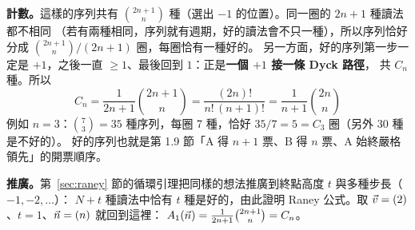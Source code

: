 \textbf{計數。}這樣的序列共有 $\binom{2n+1}{n}$ 種（選出 $-1$ 的位置）。同一圈的 $2n+1$ 種讀法都不相同
（若有兩種相同，序列就有週期，好的讀法會不只一種），所以序列恰好分成 $\binom{2n+1}{n}/(2n+1)$ 圈，每圈恰有一種好的。
另一方面，好的序列第一步一定是 $+1$，之後一直 $\ge1$、最後回到 $1$：正是\textbf{一個 $+1$ 接一條 Dyck 路徑}，
共 $C_n$ 種。所以
\begin{equation}\label{eq:m04-cycle}
\boxed{\;C_n=\frac{1}{2n+1}\binom{2n+1}{n}=\frac{(2n)!}{n!\,(n+1)!}=\frac{1}{n+1}\binom{2n}{n}\;}
\end{equation}
例如 $n=3$：$\binom{7}{3}=35$ 種序列，每圈 7 種，恰好 $35/7=5=C_3$ 圈（另外 30 種是不好的）。
好的序列也就是第 1.9 節「A 得 $n+1$ 票、B 得 $n$ 票、A 始終嚴格領先」的開票順序。

\textbf{推廣。}第~\ref{sec:raney} 節的循環引理把同樣的想法推廣到終點高度 $t$ 與多種步長（$-1,-2,\ldots$）：
$N+t$ 種讀法中恰有 $t$ 種是好的，由此證明 Raney 公式。取 $\vec v=(2)$、$t=1$、$\vec n=(n)$ 就回到這裡：
$A_1(\vec n)=\frac{1}{2n+1}\binom{2n+1}{n}=C_n$。
